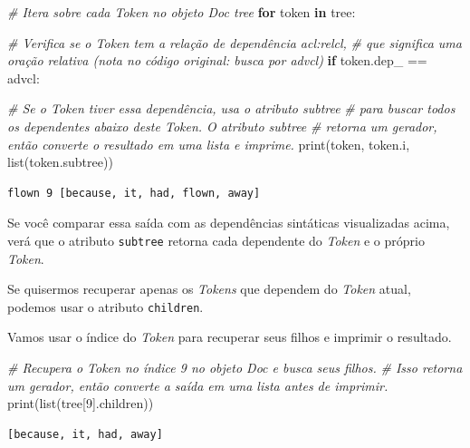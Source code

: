 \documentclass[
  brazilian,
]{article}
\newenvironment{Shaded}{}{}
\newcommand{\BuiltInTok}[1]{#1}
\newcommand{\CommentTok}[1]{\textcolor[rgb]{0.38,0.63,0.69}{\textit{#1}}}
\newcommand{\ControlFlowTok}[1]{\textcolor[rgb]{0.00,0.44,0.13}{\textbf{#1}}}
\newcommand{\DecValTok}[1]{\textcolor[rgb]{0.25,0.63,0.44}{#1}}
\newcommand{\KeywordTok}[1]{\textcolor[rgb]{0.00,0.44,0.13}{\textbf{#1}}}
\newcommand{\NormalTok}[1]{#1}
\newcommand{\OperatorTok}[1]{\textcolor[rgb]{0.40,0.40,0.40}{#1}}
\newcommand{\StringTok}[1]{\textcolor[rgb]{0.25,0.44,0.63}{#1}}
\begin{document}
\begin{Shaded}
\begin{Highlighting}[]
\CommentTok{\# Itera sobre cada Token no objeto Doc \textquotesingle{}tree\textquotesingle{}}
\ControlFlowTok{for}\NormalTok{ token }\KeywordTok{in}\NormalTok{ tree:}
    
    \CommentTok{\# Verifica se o Token tem a relação de dependência \textquotesingle{}acl:relcl\textquotesingle{},}
    \CommentTok{\# que significa uma oração relativa (nota no código original: busca por \textquotesingle{}advcl\textquotesingle{})}
    \ControlFlowTok{if}\NormalTok{ token.dep\_ }\OperatorTok{==} \StringTok{\textquotesingle{}advcl\textquotesingle{}}\NormalTok{:}
        
        \CommentTok{\# Se o Token tiver essa dependência, usa o atributo subtree}
        \CommentTok{\# para buscar todos os dependentes abaixo deste Token. O atributo subtree}
        \CommentTok{\# retorna um gerador, então converte o resultado em uma lista e imprime.}
        \BuiltInTok{print}\NormalTok{(token, token.i, }\BuiltInTok{list}\NormalTok{(token.subtree))}
\end{Highlighting}
\end{Shaded}

\begin{verbatim}
flown 9 [because, it, had, flown, away]
\end{verbatim}

Se você comparar essa saída com as dependências sintáticas visualizadas
acima, verá que o atributo \texttt{subtree} retorna cada dependente do
\emph{Token} e o próprio \emph{Token}.

Se quisermos recuperar apenas os \emph{Tokens} que dependem do
\emph{Token} atual, podemos usar o atributo \texttt{children}.

Vamos usar o índice do \emph{Token} para recuperar seus filhos e
imprimir o resultado.

\begin{Shaded}
\begin{Highlighting}[]
\CommentTok{\# Recupera o Token no índice 9 no objeto Doc e busca seus filhos.}
\CommentTok{\# Isso retorna um gerador, então converte a saída em uma lista antes de imprimir.}
\BuiltInTok{print}\NormalTok{(}\BuiltInTok{list}\NormalTok{(tree[}\DecValTok{9}\NormalTok{].children))}
\end{Highlighting}
\end{Shaded}

\begin{verbatim}
[because, it, had, away]
\end{verbatim}
\end{document}
